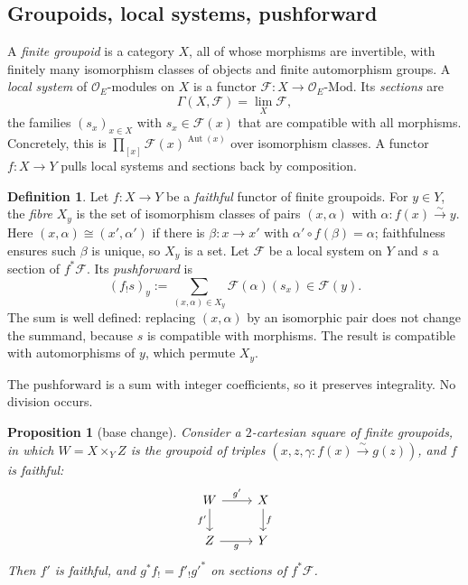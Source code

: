 \documentclass[11pt]{amsart}
\newtheorem{proposition}[theorem]{Proposition}
\theoremstyle{definition}
\newtheorem{definition}[theorem]{Definition}
\theoremstyle{remark}
\newcommand{\OEring}{\mathcal{O}_E}
\DeclareMathOperator{\Aut}{Aut}
\begin{document}
\subsection{Groupoids, local systems, pushforward}
A \emph{finite groupoid} is a category $X$, all of whose morphisms are invertible, with finitely many isomorphism classes of objects and finite automorphism groups. A \emph{local system} of $\OEring$-modules on $X$ is a functor $\mathcal F\colon X\to\OEring\text{-Mod}$. Its \emph{sections} are
\[
\Gamma(X,\mathcal F)=\lim_X\mathcal F,
\]
the families $(s_x)_{x\in X}$ with $s_x\in\mathcal F(x)$ that are compatible with all morphisms. Concretely, this is $\prod_{[x]}\mathcal F(x)^{\Aut(x)}$ over isomorphism classes. A functor $f\colon X\to Y$ pulls local systems and sections back by composition.

\begin{definition}\label{def:pushforward}
Let $f\colon X\to Y$ be a \emph{faithful} functor of finite groupoids. For $y\in Y$, the \emph{fibre} $X_y$ is the set of isomorphism classes of pairs $(x,\alpha)$ with $\alpha\colon f(x)\xrightarrow{\sim}y$. Here $(x,\alpha)\cong(x',\alpha')$ if there is $\beta\colon x\to x'$ with $\alpha'\circ f(\beta)=\alpha$; faithfulness ensures such $\beta$ is unique, so $X_y$ is a set. Let $\mathcal F$ be a local system on $Y$ and $s$ a section of $f^*\mathcal F$. Its \emph{pushforward} is
\[
(f_!s)_y:=\sum_{(x,\alpha)\in X_y}\mathcal F(\alpha)(s_x)\in\mathcal F(y).
\]
The sum is well defined: replacing $(x,\alpha)$ by an isomorphic pair does not change the summand, because $s$ is compatible with morphisms. The result is compatible with automorphisms of $y$, which permute $X_y$.
\end{definition}

The pushforward is a sum with integer coefficients, so it preserves integrality. No division occurs.

\begin{proposition}[base change]\label{prop:base-change}
Consider a $2$-cartesian square of finite groupoids, in which $W=X\times_Y Z$ is the groupoid of triples $(x,z,\gamma\colon f(x)\xrightarrow{\sim}g(z))$, and $f$ is faithful:
\[
\begin{tikzcd}
W\arrow[r,"g'"]\arrow[d,"f'"'] & X\arrow[d,"f"]\\
Z\arrow[r,"g"'] & Y
\end{tikzcd}
\]
Then $f'$ is faithful, and $g^*f_!=f'_!g'^*$ on sections of $f^*\mathcal F$.
\end{proposition}
\end{document}

